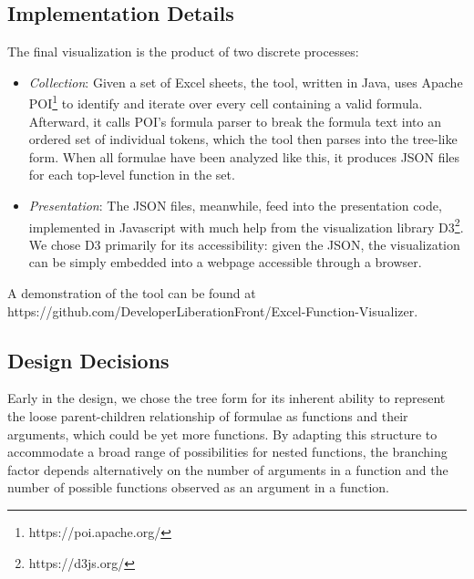 \documentclass[conference]{IEEEtran}
\begin{document}
	\subsection{Implementation Details} The final visualization is the product of
	two discrete processes: \begin{itemize} \item \textit{Collection}: Given a set
		of Excel sheets, the tool, written in Java, uses Apache
		POI\footnote{https://poi.apache.org/} to identify and iterate over every cell
		containing a valid formula. Afterward, it calls POI's formula parser to break
		the formula text into an ordered set of individual tokens, which the tool then
		parses into the tree-like form. When all formulae have been analyzed like this,
		it produces JSON files for each top-level function in the set.
		
		\item \textit{Presentation}: The JSON files, meanwhile, feed into the
		presentation code, implemented in Javascript with much help from the
		visualization library D3\footnote{https://d3js.org/}. We chose D3 primarily
		for its accessibility: given the JSON, the visualization can be simply
		embedded into a webpage accessible through a browser. \end{itemize} A
	demonstration of the tool can be found at
	https://github.com/DeveloperLiberationFront/Excel-Function-Visualizer.
	
	\subsection{Design Decisions} \label{ssec:decisions} Early in the design, we
	chose the tree form for its inherent ability to represent the loose
	parent-children relationship of formulae as functions and their arguments,
	which could be yet more functions. By adapting this structure to accommodate a
	broad range of possibilities for nested functions, the branching factor depends
	alternatively on the number of arguments in a function and the number of
	possible functions observed as an argument in a function. \par
	
\end{document}
